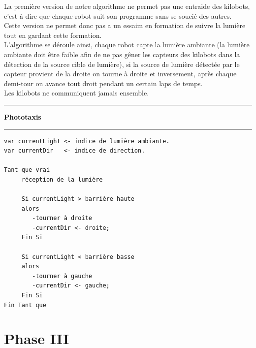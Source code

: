 \documentclass[a4paper,8pt]{report}
\begin{document}
\smallskip
La premi\`ere version de notre algorithme ne permet pas une entraide des kilobots, c'est \`a dire que chaque robot suit son programme sans se souci\'e des autres.\\
Cette version ne permet donc pas a un essaim en formation de suivre la lumi\`ere tout en gardant cette formation.\\
L'algorithme se d\'eroule ainsi, chaque robot capte la lumi\`ere ambiante (la lumi\`ere ambiante doit \^etre faible afin de ne pas g\^ener les capteurs des kilobots dans la d\'etection de la source cible de lumi\`ere), si la source de lumi\`ere d\'etect\'ee par le capteur provient de la droite on tourne \`a droite et inversement, apr\`es chaque demi-tour on avance tout droit pendant un certain laps de temps.\\
Les kilobots ne communiquent jamais ensemble.\\

\newpage
\begin{center}
  \rule{\linewidth}{.5pt}
  \textbf{Phototaxis}\\
  \rule{\linewidth}{.5pt}
\end{center}

\begin{verbatim}
var currentLight <- indice de lumière ambiante.
var currentDir   <- indice de direction.

Tant que vrai   
     réception de la lumière

     Si currentLight > barrière haute
     alors
        -tourner à droite
        -currentDir <- droite;
     Fin Si
 
     Si currentLight < barrière basse
     alors
        -tourner à gauche
        -currentDir <- gauche;
     Fin Si
Fin Tant que
\end{verbatim}



\section*{Phase III}\label{sec:name}

\end{document}
